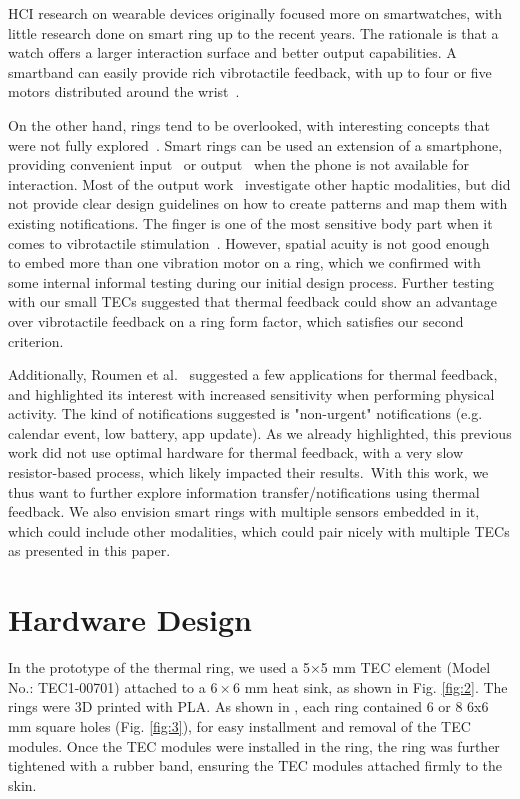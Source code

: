 \documentclass[preprint,12pt]{elsarticle}
\begin{document}
HCI research on wearable devices originally focused more on smartwatches, with little research done on smart ring up to the recent years.
The rationale is that a watch offers a larger interaction surface and better output capabilities.
A smartband can easily provide rich vibrotactile feedback, with up to four or five motors distributed around the wrist~\cite{2}.

On the other hand, rings tend to be overlooked, with interesting concepts that were not fully explored~\cite{Ringteraction,PairRing,OctaRing}.
Smart rings can be used an extension of a smartphone, providing convenient input~\cite{Ringteraction,PairRing} or output~\cite{24} when the phone is not available for interaction.
Most of the output work~\cite{14,16,24} investigate other haptic modalities, but did not provide clear design guidelines on how to create patterns and map them with existing notifications.
The finger is one of the most sensitive body part when it comes to vibrotactile stimulation~\cite{Gibson}.
However, spatial acuity is not good enough~\cite{Gibson} to embed more than one vibration motor on a ring, which we confirmed with some internal informal testing during our initial design process.
Further testing with our small TECs suggested that thermal feedback could show an advantage over vibrotactile feedback on a ring form factor, which satisfies our second criterion.

Additionally, Roumen et al.~\cite{24} suggested a few applications for thermal feedback, and highlighted its interest with increased sensitivity when performing physical activity.
The kind of notifications suggested is "non-urgent" notifications (e.g. calendar event, low battery, app update).
As we already highlighted, this previous work did not use optimal hardware for thermal feedback, with a very slow resistor-based process, which likely impacted their results.\
With this work, we thus want to further explore information transfer/notifications using thermal feedback.
We also envision smart rings with multiple sensors embedded in it, which could include other modalities, which could pair nicely with multiple TECs as presented in this paper.

\section{Hardware Design}

In the prototype of the thermal ring, we used a 5×5 mm TEC element (Model No.: TEC1-00701) attached to a $6 \times 6$ mm heat sink, as shown in Fig. \ref{fig:2}.  The rings were 3D printed with PLA. As shown in , each ring contained 6 or 8 6x6 mm square holes (Fig. \ref{fig:3}), for easy installment and removal of the TEC modules. Once the TEC modules were installed in the ring, the ring was further tightened with a rubber band, ensuring the TEC modules attached firmly to the skin.
\end{document}
